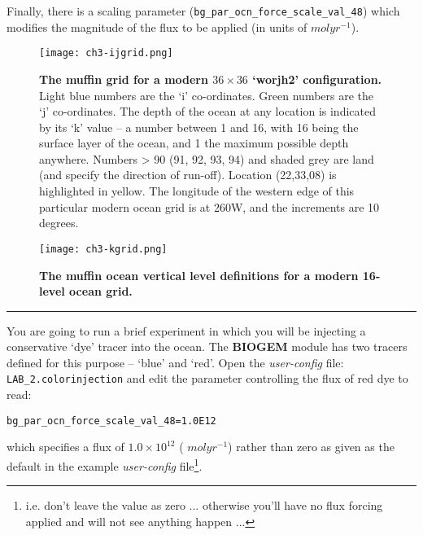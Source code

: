 \documentclass[11pt,fleqn]{book} %
\begin{document}
Finally, there is a scaling parameter (\texttt{bg\_par\_ocn\_force\_scale\_val\_48}) which modifies the magnitude of the flux to be applied (in units of \(mol yr^{-1}\)).

\begin{figure}
\texttt{[image: ch3-ijgrid.png]}\centering
\vspace{-0mm}
\caption{
\textbf{The  muffin grid for a modern \(36\times36\) ‘worjh2’ configuration.} Light blue numbers are the ‘i’ co-ordinates. Green numbers are the ‘j’ co-ordinates.
The depth of the ocean at any location is indicated by its ‘k’ value – a number between 1 and 16, with 16 being the surface layer of the ocean, and 1 the maximum possible depth anywhere.
Numbers > 90 (91, 92, 93, 94) and shaded grey are land (and specify the direction of run-off).
Location (22,33,08) is highlighted in yellow.
The longitude of the western edge of this particular modern ocean grid is at 260W, and the increments are 10 degrees.
}
\label{fig:ch3-ijgrid}
\end{figure}

\begin{figure}
\texttt{[image: ch3-kgrid.png]}\centering
\vspace{-0mm}
\caption{\textbf{The muffin ocean vertical level definitions for a modern 16-level ocean grid.}}
\label{fig:ch3-kgrid}
\end{figure}

\hfill \break
\noindent\rule{4cm}{0.1mm}
\hfill \break

\noindent You are going to run a brief experiment in which you will be injecting a conservative ‘dye’ tracer into the ocean. The \textbf{BIOGEM} module has two tracers defined for this purpose – ‘blue’ and ‘red’. Open the \textit{user-config} file: \texttt{LAB\_2.colorinjection} and edit the parameter controlling the flux of red dye to read:

\vspace{-2mm}
\begin{verbatim}
bg_par_ocn_force_scale_val_48=1.0E12
\end{verbatim}
\vspace{-2mm}

\noindent which specifies a flux of \(1.0\times10^{12}\) ( \(mol yr^{-1}\)) rather than zero as given as the default in the example \textit{user-config} file\footnote{i.e. don't leave the value as zero ... otherwise you'll have no flux forcing applied and will not see anything happen ...}.
\end{document}
